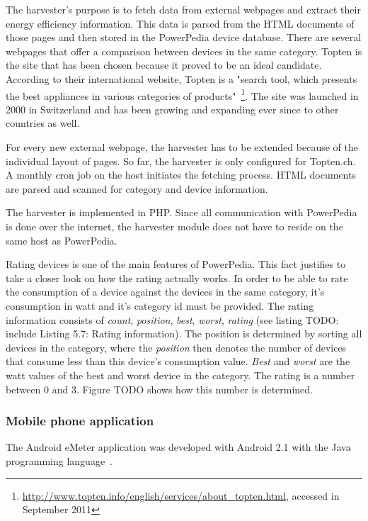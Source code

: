 The harvester's purpose is to fetch data from external webpages and extract their energy efficiency information. This data is parsed from the HTML documents of those pages and then stored in the PowerPedia device database.
There are several webpages that offer a comparison between devices in the same category. Topten is the site that has been chosen because it proved to be an ideal candidate. According to their international website, Topten is a "search tool, which presents the best appliances in various categories of products"~\footnote{\url{http://www.topten.info/english/services/about_topten.html}, accessed in September 2011}. The site was launched in 2000 in Switzerland and has been growing and expanding ever since to other countries as well. 

For every new external webpage, the harvester has to be extended because of the individual layout of pages. So far, the harvester is only configured for Topten.ch. A monthly cron job on the host initiates the fetching process. HTML documents are parsed and scanned for category and device information. 

The harvester is implemented in PHP. Since all communication with PowerPedia is done over the internet, the harvester module does not have to reside on the same host as PowerPedia. 


Rating devices is one of the main features of PowerPedia. This fact justifies to take a closer look on how the rating actually works.
In order to be able to rate the consumption of a device against the devices in the same category, it's consumption in watt and it's category id must be provided. 
The rating information consists of \textit{count}, \textit{position}, \textit{best}, \textit{worst}, \textit{rating} (see listing TODO: include Listing 5.7: Rating information). The position is determined by sorting all devices in the category, where the \textit{position} then denotes the number of devices that consume less than this device's consumption value. \textit{Best} and \textit{worst} are the watt values of the best and worst device in the category. The rating is a number between 0 and 3. Figure TODO shows how this number is determined.
 
\subsubsection{Mobile phone application}
The Android eMeter application was developed with Android 2.1 with the Java programming language~\cite{http://java.com/}.

